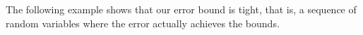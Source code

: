 \documentclass[review]{elsarticle}
\newtheorem{example}{Example}
\begin{document}
%
%
The following example shows that our error bound is tight, that is,
a sequence of random variables where the error actually achieves
the bounds.
\end{document}
